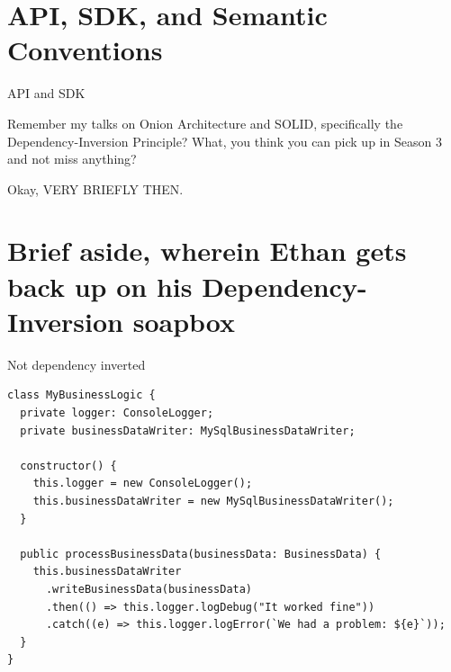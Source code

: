 \documentclass[aspectratio=169]{beamer}
\begin{document}
\section{API, SDK, and Semantic Conventions}

\begin{frame}{API and SDK}

  Remember my talks on Onion Architecture and SOLID, specifically the
  Dependency-Inversion Principle? What, you think you can pick up in Season 3
  and not miss anything?

  \vspace{1em}

  Okay, VERY BRIEFLY THEN.

\end{frame}

\section{Brief aside, wherein Ethan gets back up on his Dependency-Inversion soapbox}

\begin{frame}[fragile]{Not dependency inverted}
  \begin{lstlisting}[basicstyle=\footnotesize]
class MyBusinessLogic {
  private logger: ConsoleLogger;
  private businessDataWriter: MySqlBusinessDataWriter;

  constructor() {
    this.logger = new ConsoleLogger();
    this.businessDataWriter = new MySqlBusinessDataWriter();
  }

  public processBusinessData(businessData: BusinessData) {
    this.businessDataWriter
      .writeBusinessData(businessData)
      .then(() => this.logger.logDebug("It worked fine"))
      .catch((e) => this.logger.logError(`We had a problem: ${e}`));
  }
}
  \end{lstlisting}
\end{frame}
\end{document}
